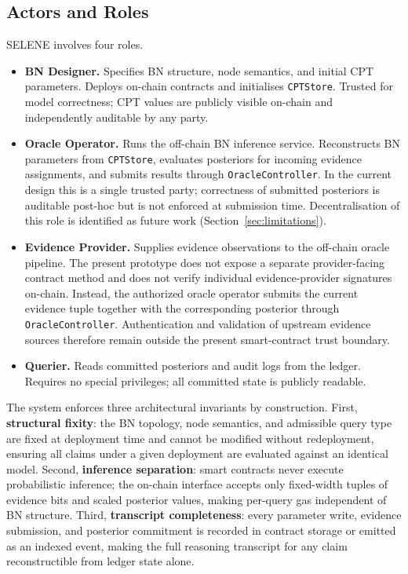 \documentclass[journal]{IEEEtran}
\theoremstyle{definition}
\theoremstyle{remark}
\begin{document}
\subsection{Actors and Roles}

SELENE involves four roles.

\begin{itemize}

  \item \textbf{BN Designer.}
  Specifies BN structure, node semantics, and initial
  CPT parameters. Deploys on-chain contracts and
  initialises \texttt{CPTStore}. Trusted for model
  correctness; CPT values are publicly visible on-chain
  and independently auditable by any party.

  \item \textbf{Oracle Operator.}
  Runs the off-chain BN inference service. Reconstructs
  BN parameters from \texttt{CPTStore}, evaluates
  posteriors for incoming evidence assignments, and
  submits results through \texttt{OracleController}.
  In the current design this is a single trusted party;
  correctness of submitted posteriors is auditable
  post-hoc but is not enforced at submission time.
  Decentralisation of this role is identified as future
  work (Section~\ref{sec:limitations}).

  \item \textbf{Evidence Provider.}
  Supplies evidence observations to the off-chain oracle
  pipeline. The present prototype does not expose a separate
  provider-facing contract method and does not verify
  individual evidence-provider signatures on-chain.
  Instead, the authorized oracle operator submits the
  current evidence tuple together with the corresponding
  posterior through \texttt{OracleController}. Authentication
  and validation of upstream evidence sources therefore
  remain outside the present smart-contract trust boundary.

  \item \textbf{Querier.}
  Reads committed posteriors and audit logs from the
  ledger. Requires no special privileges; all committed
  state is publicly readable.

\end{itemize}

The system enforces three architectural invariants by
construction. First, \textbf{structural fixity}: the BN
topology, node semantics, and admissible query type are
fixed at deployment time and cannot be modified without
redeployment, ensuring all claims under a given
deployment are evaluated against an identical model.
Second, \textbf{inference separation}: smart contracts
never execute probabilistic inference; the on-chain
interface accepts only fixed-width tuples of evidence
bits and scaled posterior values, making per-query gas
independent of BN structure.
Third, \textbf{transcript completeness}: every parameter
write, evidence submission, and posterior commitment is
recorded in contract storage or emitted as an indexed
event, making the full reasoning transcript for any
claim reconstructible from ledger state alone.
\end{document}
